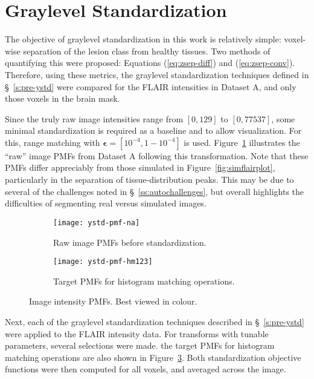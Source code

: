 \section{Graylevel Standardization}\label{ss:exp-ystd-jsep}
The objective of graylevel standardization in this work is relatively simple:
voxel-wise separation of the lesion class from healthy tissues.
Two methods of quantifying this were proposed:
Equations (\ref{eq:zsep-diff}) and (\ref{eq:zsep-conv}).
Therefore, using these metrics,
the graylevel standardization techniques defined in \S~\ref{s:pre-ystd} were compared
for the FLAIR intensities in Dataset A, and only those voxels in the brain mask.
\par
Since the truly raw image intensities range from $[0,129]$ to $[0,77537]$,
some minimal standardization is required as a baseline and to allow visualization.
For this, range matching with $\bm{\epsilon} = [10^{-4},1-10^{-4}]$ is used.
Figure~\ref{fig:ystd-pmf-raw} illustrates the ``raw'' image PMFs from Dataset A
following this transformation.
Note that these PMFs differ appreciably from those simulated in Figure~\ref{fig:simflairplot},
particularly in the separation of tissue-distribution peaks.
This may be due to several of the challenges noted in \S~\ref{ss:autochallenges},
but overall highlights the difficulties of segmenting real versus simulated images.
\par
\begin{figure}
  \begin{subfigure}{0.495\textwidth}
    \centering
    \texttt{[image: ystd-pmf-na]}
    \caption{Raw image PMFs before standardization.}%
    \label{fig:ystd-pmf-raw}
  \end{subfigure}
  \begin{subfigure}{0.495\textwidth}
    \centering
    \texttt{[image: ystd-pmf-hm123]}
    \caption{Target PMFs for histogram matching operations.}%
    \label{fig:ystd-pmf-target}
  \end{subfigure}
  \caption{Image intensity PMFs. Best viewed in colour.}
\end{figure}
Next, each of the graylevel standardization techniques described in \S~\ref{s:pre-ystd}
were applied to the FLAIR intensity data.
For transforms with tunable parameters, several selections were made.
the target PMFs for histogram matching operations are also shown in Figure~\ref{fig:ystd-pmf-target}.
Both standardization objective functions were then computed for all voxels,
and averaged across the image.
